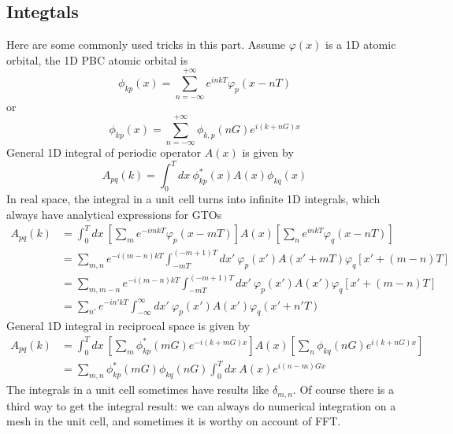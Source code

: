 \documentclass{article}
\begin{document}
    \subsection{Integtals}
        Here are some commonly used tricks in this part. 
        Assume $\varphi(x)$ is a 1D atomic orbital, the 1D PBC atomic orbital is
        $$ \phi_{kp}(x) = \sum_{n=-\infty}^{+\infty}e^{inkT}\varphi_p(x-nT) $$
        or
        $$ \phi_{kp}(x) = \sum_{n=-\infty}^{+\infty}\phi_{k,p}(nG)e^{i(k+nG)x} $$
        General 1D integral of periodic operator $A(x)$ is given by
        $$ A_{pq}(k) = \int_0^Tdx\ \phi_{kp}^*(x)A(x)\phi_{kq}(x) $$
        In real space, the integral in a unit cell turns into infinite 1D integrals, 
        which always have analytical expressions for GTOs
        \begin{align*}
            A_{pq}(k) &= \int_0^Tdx\ \left[\sum_{m}e^{-imkT}\varphi_p(x-mT)\right]A(x)\left[\sum_{n}e^{inkT}\varphi_q(x-nT)\right] \\
            &= \sum_{m,n}e^{-i(m-n)kT}\int_{-mT}^{(-m+1)T}dx'\ \varphi_p(x')A(x'+mT)\varphi_q[x'+(m-n)T] \\
            &= \sum_{m,m-n}e^{-i(m-n)kT}\int_{-mT}^{(-m+1)T}dx'\ \varphi_p(x')A(x')\varphi_q[x'+(m-n)T] \\
            &= \sum_{n'}e^{-in'kT}\int_{-\infty}^{\infty}dx'\ \varphi_p(x')A(x')\varphi_q(x'+n'T)
        \end{align*}
        General 1D integral in reciprocal space is given by
        \begin{align*}
            A_{pq}(k) &= \int_0^Tdx\ \left[\sum_m\phi_{kp}^*(mG)e^{-i(k+mG)x}\right]A(x)\left[\sum_n\phi_{kq}(nG)e^{i(k+nG)x}\right] \\
            &= \sum_{m,n}\phi_{kp}^*(mG)\phi_{kq}(nG)\int_0^Tdx\ A(x)e^{i(n-m)Gx}
        \end{align*}
        The integrals in a unit cell sometimes have results like $\delta_{m,n}$.
        Of course there is a third way to get the integral result:
        we can always do numerical integration on a mesh in the unit cell,
        and sometimes it is worthy on account of FFT.
        
\end{document}
